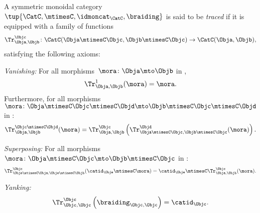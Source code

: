 \begin{ctdefinition}
  \label{def:traced-monoidal-category}
  A symmetric monoidal category~$\tup{\CatC,\mtimesC,\idmoncat_{\CatC}, \braiding}$ is said to be \emph{traced} if it is equipped with a family of functions
  \begin{equation}
    \Tr_{\Obja,\Objb}^\Objc\colon \CatC(\Obja \mtimesC \Objc, \Objb\mtimesC \Objc)\to \CatC(\Obja,\Objb),
  \end{equation}
  satisfying the following axioms:
  \begin{compactenum}
    \item \emph{Vanishing:} For all morphisms~$\mora \colon \Obja\mto \Objb$ in \CatC,
    \begin{equation}
      \label{eq:vanishing_1}
      \Tr_{\Obja,\Objb}^1(\mora)=\mora.
    \end{equation}
    Furthermore, for all morphisms~$\mora \colon \Obja\mtimesC \Objc \mtimesC \Objd \mto \Objb\mtimesC \Objc \mtimesC \Objd$ in \CatC:
    \begin{equation}
      \label{eq:vanishing_2}
      \Tr_{\Obja,\Objb}^{\Objc\mtimesC \Objd}(\mora)=\Tr_{\Obja,\Objb}^\Objc\left(
      \Tr_{\Obja \mtimesC \Objc , \Objb \mtimesC \Objc}^\Objd(\mora)\right).
    \end{equation}
    \item \emph{Superposing:} For all morphisms~$\mora\colon \Obja\mtimesC \Objc \mto \Objb\mtimesC \Objc$ in \CatC:
    \begin{equation}
      \label{eq:superposing}
      \Tr_{\Obje\mtimesC \Obja,\Obje\mtimesC \Objb}^{\Objc}(\catid_\Obje\mtimesC \mora)=\catid_\Obje\mtimesC \Tr_{\Obja,\Objb}^\Objc(\mora).
    \end{equation}
    \item \emph{Yanking:}
    \begin{equation}
      \label{eq:yanking}
      \Tr_{\Objc,\Objc}^\Objc\left(\braiding_{\Objc,\Objc}\right)=\catid_\Objc.
    \end{equation}
  \end{compactenum}
\end{ctdefinition}
